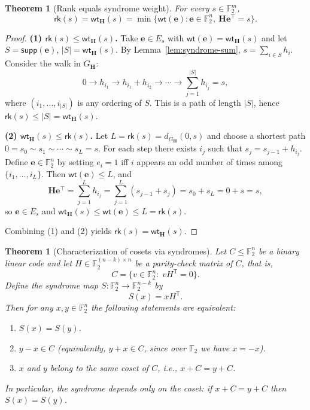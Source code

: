 \documentclass[11pt,twoside,leqno]{article}
\theoremstyle{definition}
\theoremstyle{plain}
\newtheorem{theorem}[definition]{Theorem}
\theoremstyle{remark}
\newcommand{\Ftwo}{\mathbb{F}_2}
\newcommand{\wt}{\mathsf{wt}}
\newcommand{\supp}{\mathsf{supp}}
\newcommand{\rk}{\mathsf{rk}}
\newcommand{\HH}{\mathbf{H}}
\newcommand{\ee}{\mathbf{e}}
\begin{document}
\begin{theorem}[Rank equals syndrome weight]\label{thm:rk-equals-wtH}
For every $s\in\Ftwo^m$,
\[
\rk(s)=\wt_{\HH}(s)=\min\{\wt(\ee): \ee\in\Ftwo^n,\ \HH\ee^\top=s\}.
\]
\end{theorem}

\begin{proof}
\noindent\textbf{(1) $\rk(s)\le \wt_{\HH}(s)$.}
Take $\ee\in E_s$ with $\wt(\ee)=\wt_{\HH}(s)$ and let $S=\supp(\ee)$, $|S|=\wt_{\HH}(s)$.
By Lemma~\ref{lem:syndrome-sum}, $s=\sum_{i\in S}h_i$.
Consider the walk in $G_\HH$:
\[
0\to h_{i_1}\to h_{i_1}+h_{i_2}\to\cdots\to \sum_{j=1}^{|S|}h_{i_j}=s,
\]
where $(i_1,\dots,i_{|S|})$ is any ordering of $S$. This is a path of length $|S|$, hence $\rk(s)\le |S|=\wt_{\HH}(s)$.

\smallskip
\noindent\textbf{(2) $\wt_{\HH}(s)\le \rk(s)$.}
Let $L=\rk(s)=d_{G_\HH}(0,s)$ and choose a shortest path
$0=s_0\sim s_1\sim\cdots\sim s_L=s$.
For each step there exists $i_j$ such that $s_j=s_{j-1}+h_{i_j}$.
Define $\ee\in\Ftwo^n$ by setting $e_i=1$ iff $i$ appears an odd number of times among $\{i_1,\dots,i_L\}$.
Then $\wt(\ee)\le L$, and
\[
\HH\ee^\top=\sum_{j=1}^L h_{i_j}=\sum_{j=1}^L(s_{j-1}+s_j)=s_0+s_L=0+s=s,
\]
so $\ee\in E_s$ and $\wt_{\HH}(s)\le \wt(\ee)\le L=\rk(s)$.

Combining (1) and (2) yields $\rk(s)=\wt_{\HH}(s)$.
\end{proof}

\begin{theorem}[Characterization of cosets via syndromes]\label{thm:coset-syndrome-en}
Let $C\le \mathbb{F}_2^n$ be a binary linear code and let
$H\in \mathbb{F}_2^{(n-k)\times n}$ be a parity-check matrix of $C$, that is,
\[
C=\{v\in\mathbb{F}_2^n:\; vH^{\mathsf T}=0\}.
\]
Define the \emph{syndrome} map $S:\mathbb{F}_2^n\to \mathbb{F}_2^{n-k}$ by
\[
S(x)=xH^{\mathsf T}.
\]
Then for any $x,y\in \mathbb{F}_2^n$ the following statements are equivalent:
\begin{enumerate}[label=\textnormal{(\roman*)}]
\item $S(x)=S(y)$.
\item $y-x\in C$ \;\;(equivalently, $y+x\in C$, since over $\mathbb{F}_2$ we have $x=-x$).
\item $x$ and $y$ belong to the same coset of $C$, i.e., $x+C=y+C$.
\end{enumerate}
In particular, the syndrome depends \emph{only} on the coset: if $x+C=y+C$ then $S(x)=S(y)$.
\end{theorem}
\end{document}
